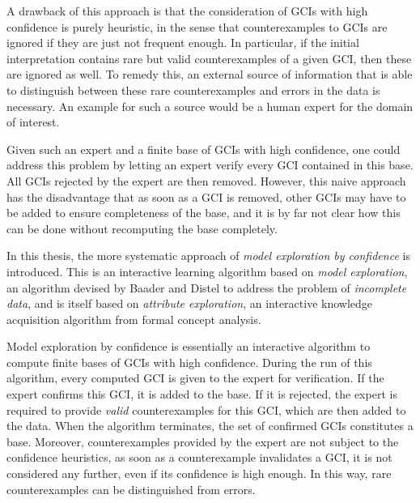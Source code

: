 \documentclass[english,fleqn]{scrartcl}
\begin{document}
A drawback of this approach is that the consideration of GCIs with high confidence is
purely heuristic, in the sense that counterexamples to GCIs are ignored if they are just
not frequent enough.  In particular, if the initial interpretation contains rare but valid
counterexamples of a given GCI, then these are ignored as well.  To remedy this, an
external source of information that is able to distinguish between these rare
counterexamples and errors in the data is necessary.  An example for such a source would
be a human expert for the domain of interest.

Given such an expert and a finite base of GCIs with high confidence, one could address
this problem by letting an expert verify every GCI contained in this base.  All GCIs
rejected by the expert are then removed.  However, this naive approach has the
disadvantage that as soon as a GCI is removed, other GCIs may have to be added to ensure
completeness of the base, and it is by far not clear how this can be done without
recomputing the base completely.

In this thesis, the more systematic approach of \emph{model exploration by confidence} is
introduced.  This is an interactive learning algorithm based on \emph{model exploration},
an algorithm devised by Baader and Distel to address the problem of \emph{incomplete
  data}, and is itself based on \emph{attribute exploration}, an interactive knowledge
acquisition algorithm from formal concept analysis.

Model exploration by confidence is essentially an interactive algorithm to compute finite
bases of GCIs with high confidence.  During the run of this algorithm, every computed GCI
is given to the expert for verification.  If the expert confirms this GCI, it is added to
the base.  If it is rejected, the expert is required to provide \emph{valid}
counterexamples for this GCI, which are then added to the data.  When the algorithm
terminates, the set of confirmed GCIs constitutes a base.  Moreover, counterexamples
provided by the expert are not subject to the confidence heuristics, \ie as soon as a
counterexample invalidates a GCI, it is not considered any further, even if its confidence
is high enough.  In this way, rare counterexamples can be distinguished from errors.

\printbibliography{}
\end{document}
